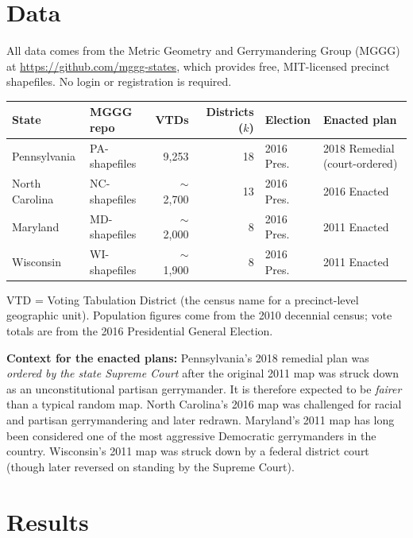 \documentclass[11pt]{article}
\begin{document}
\section{Data}
\label{sec:data}

All data comes from the Metric Geometry and Gerrymandering Group
(MGGG) at \url{https://github.com/mggg-states}, which provides free,
MIT-licensed precinct shapefiles. No login or registration is required.

\begin{center}
\begin{tabular}{llrrll}
\toprule
State & MGGG repo & VTDs & Districts ($k$) & Election & Enacted plan \\
\midrule
Pennsylvania & PA-shapefiles & 9{,}253 & 18 & 2016 Pres. & 2018 Remedial (court-ordered) \\
North Carolina & NC-shapefiles & $\sim$2{,}700 & 13 & 2016 Pres. & 2016 Enacted \\
Maryland & MD-shapefiles & $\sim$2{,}000 & 8 & 2016 Pres. & 2011 Enacted \\
Wisconsin & WI-shapefiles & $\sim$1{,}900 & 8 & 2016 Pres. & 2011 Enacted \\
\bottomrule
\end{tabular}
\end{center}

VTD = Voting Tabulation District (the census name for a precinct-level
geographic unit). Population figures come from the 2010 decennial
census; vote totals are from the 2016 Presidential General Election.

\textbf{Context for the enacted plans:}
Pennsylvania's 2018 remedial plan was \emph{ordered by the state
Supreme Court} after the original 2011 map was struck down as an
unconstitutional partisan gerrymander. It is therefore expected to be
\emph{fairer} than a typical random map. North Carolina's 2016 map was
challenged for racial and partisan gerrymandering and later redrawn.
Maryland's 2011 map has long been considered one of the most aggressive
Democratic gerrymanders in the country. Wisconsin's 2011 map was struck
down by a federal district court (though later reversed on standing by
the Supreme Court).

\section{Results}
\label{sec:results}
\end{document}
